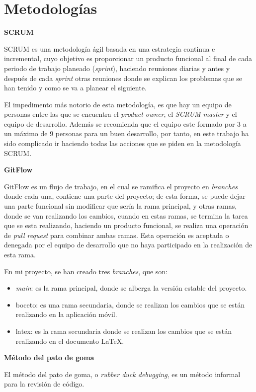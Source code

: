 
\section{Metodologías}
\textbf{SCRUM}

    SCRUM es una metodología ágil basada en una estrategia continua e incremental, cuyo objetivo es proporcionar un producto funcional al final de cada periodo de trabajo planeado (\textit{sprint}), haciendo reuniones diarias y antes y después de cada \textit{sprint} otras reuniones donde se explican los problemas que se han tenido y como se va a planear el siguiente.

    El impedimento más notorio de esta metodología, es que hay un equipo de personas entre las que se encuentra el \textit{product owner}, el \textit{SCRUM master} y el equipo de desarrollo. Además se recomienda que el equipo este formado por 3 a un máximo de 9 personas para un buen desarrollo, por tanto, en este trabajo ha sido complicado ir haciendo todas las acciones que se piden en la metodología SCRUM.

\textbf{GitFlow}

    GitFlow es un flujo de trabajo, en el cual se ramifica el proyecto en \textit{branches} donde cada una, contiene una parte del proyecto; de esta forma, se puede dejar una parte funcional sin modificar que sería la rama principal, y otras ramas, donde se van realizando los cambios, cuando en estas ramas, se termina la tarea que se esta realizando, haciendo un producto funcional, se realiza una operación de \textit{pull request} para combinar ambas ramas. Esta operación es aceptada o denegada por el equipo de desarrollo que no haya participado en la realización de esta rama.

    En mi proyecto, se han creado tres \textit{branches}, que son:
    \begin{itemize}
        \item \textit{main}: es la rama principal, donde se alberga la versión estable del proyecto.
        \item boceto: es una rama secundaria, donde se realizan los cambios que se están realizando en la aplicación móvil.
        \item latex: es la rama secundaria donde se realizan los cambios que se están realizando en el documento LaTeX.
    \end{itemize}
\textbf{Método del pato de goma}

    El método del pato de goma, o \textit{rubber duck debugging}, es un método informal para la revisión de código.

